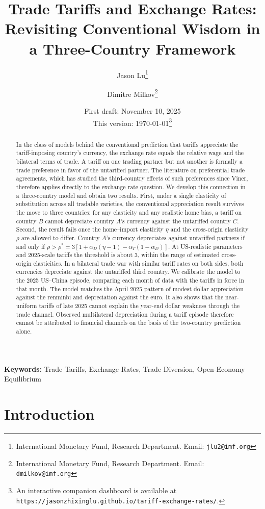 \documentclass[11pt]{article}
\title{Trade Tariffs and Exchange Rates:\\
Revisiting Conventional Wisdom in a Three-Country Framework}
\author{
Jason Lu\thanks{International Monetary Fund, Research Department. Email: {\tt jlu2@imf.org}} 
\and 
Dimitre Milkov\thanks{International Monetary Fund, Research Department. Email: {\tt dmilkov@imf.org}}
}
\date{First draft: November 10, 2025 \\ This version: \today \footnote{An interactive companion dashboard is available at {\tt https://jasonzhixinglu.github.io/tariff-exchange-rates/}.}}
\theoremstyle{plain}
\theoremstyle{remark}
\numberwithin{lemma}{section}
\numberwithin{proposition}{section}
\numberwithin{corollary}{section}
\newcommand{\rev}[1]{{\color{RevBlue}#1}}
\begin{document}
\maketitle

\begin{abstract}
\rev{In the class of models behind the conventional prediction that tariffs appreciate the tariff-imposing country's currency, the exchange rate equals the relative wage and the bilateral terms of trade. A tariff on one trading partner but not another is formally a trade preference in favor of the untariffed partner. The literature on preferential trade agreements, which has studied the third-country effects of such preferences since Viner, therefore applies directly to the exchange rate question. We develop this connection in a three-country model and obtain two results. First, under a single elasticity of substitution across all tradable varieties, the conventional appreciation result survives the move to three countries: for any elasticity and any realistic home bias, a tariff on country $B$ cannot depreciate country $A$'s currency against the untariffed country $C$. Second, the result fails once the home--import elasticity $\eta$ and the cross-origin elasticity $\rho$ are allowed to differ. Country $A$'s currency depreciates against untariffed partners if and only if $\rho > \rho^* = 3\left[1+\alpha_D(\eta-1)-\alpha_T(1-\alpha_D)\right]$. At US-realistic parameters and 2025-scale tariffs the threshold is about $3$, within the range of estimated cross-origin elasticities. In a bilateral trade war with similar tariff rates on both sides, both currencies depreciate against the untariffed third country. We calibrate the model to the 2025 US--China episode, comparing each month of data with the tariffs in force in that month. The model matches the April 2025 pattern of modest dollar appreciation against the renminbi and depreciation against the euro. It also shows that the near-uniform tariffs of late 2025 cannot explain the year-end dollar weakness through the trade channel. Observed multilateral depreciation during a tariff episode therefore cannot be attributed to financial channels on the basis of the two-country prediction alone.}
\end{abstract}

\noindent\textbf{Keywords:} Trade Tariffs, Exchange Rates, Trade Diversion, Open-Economy Equilibrium

\newpage
\section{Introduction}
\end{document}
